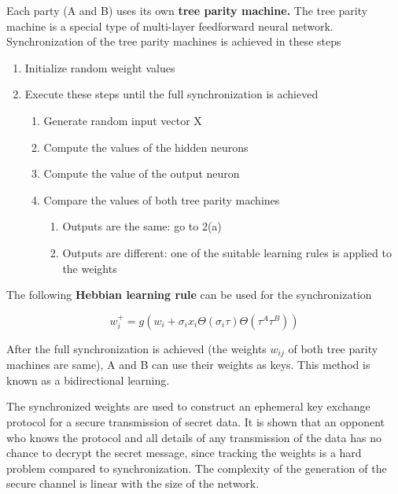 \documentclass[a4paper]{article}
\begin{document}
      \pagebreak
      Each party (A and B) uses its own {\bfseries tree parity machine.} 
      The tree parity machine is a special type of multi-layer feedforward neural network.
      Synchronization of the tree parity machines is achieved in these steps
      \begin{enumerate}
        \item Initialize random weight values
        \item Execute these steps until the full synchronization is achieved
        \begin{enumerate}
          \item Generate random input vector X
          \item Compute the values of the hidden neurons
          \item Compute the value of the output neuron
          \item Compare the values of both tree parity machines
          \begin{enumerate}
            \item Outputs are the same: go to 2(a)
            \item Outputs are different: one of the suitable learning rules is applied to the weights
          \end{enumerate}
        \end{enumerate}
      \end{enumerate}

      The following {\bfseries Hebbian learning rule} can be used for the synchronization

      \[ w_{i}^+ = g( w_{i} + {\sigma}_{i}x_{i} {\Theta}({\sigma}_{i}{\tau}) {\Theta}({\tau}^A{\tau}^B) ) \]

      After the full synchronization is achieved (the weights $w_{ij}$ of both tree 
      parity machines are same), A and B can use their weights as keys.
      This method is known as a bidirectional learning.\cite{netsync}

      The synchronized weights
      are used to construct an ephemeral key exchange protocol for a secure
      transmission of secret data. It is shown that an opponent who knows
      the protocol and all details of any transmission of the data has no
      chance to decrypt the secret message, since tracking the weights is a
      hard problem compared to synchronization\cite{netsync}. The complexity of the
      generation of the secure channel is linear with the size of the network. 

  \newpage 
\end{document}

